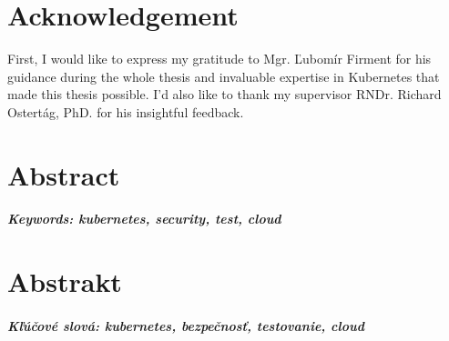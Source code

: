 \documentclass[12pt, oneside, openany]{book}
\begin{document}
\newpage
\thispagestyle{empty}
\chapter*{Acknowledgement}\label{chap:thank_you}
First, I would like to express my gratitude to Mgr. Ľubomír Firment for his guidance during the whole thesis and invaluable expertise in Kubernetes that made this thesis possible. I'd also like to thank my supervisor RNDr. Richard Ostertág, PhD. for his insightful feedback.


\vfill\eject 



\newpage 
\thispagestyle{empty}
\chapter*{Abstract}\label{chap:abstract_en}


\paragraph*{Keywords: kubernetes, security, test, cloud}  


\newpage 
\thispagestyle{empty}
\chapter*{Abstrakt}\label{chap:abstract_sk}


\paragraph*{Kľúčové slová: kubernetes, bezpečnosť, testovanie, cloud}




\newpage 
\tableofcontents



\newpage 
\listoffigures
\listoftables




\mainmatter




% 
% 
% 
% 
% 







\backmatter

\nocite{*}



\end{document}
